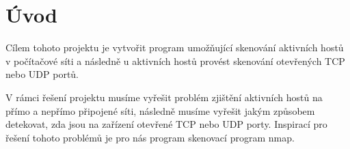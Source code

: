 \documentclass[../projekt.tex]{subfiles}
\begin{document}
\chapter{Úvod}\label{uvod}

Cílem tohoto projektu je vytvořit program umožňující skenování aktivních hostů v počítačové síti a následně u aktivních hostů provést skenování otevřených TCP nebo UDP portů.

V rámci řešení projektu musíme vyřešit problém zjištění aktivních hostů na přímo a nepřímo připojené síti, následně musíme vyřešit jakým způsobem detekovat, zda jsou na zařízení otevřené TCP nebo UDP porty. Inspirací pro řešení tohoto problémů je pro nás program skenovací program nmap\cite{NmapPortScanning}.
\end{document}
